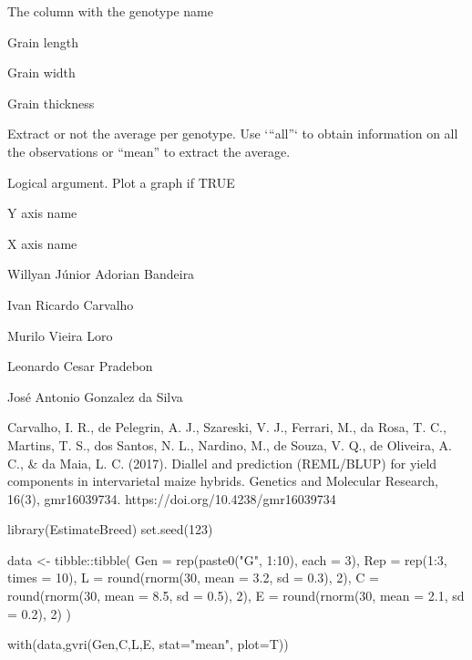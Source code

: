 \documentclass[a4paper]{book}
\begin{document}
%
\begin{Arguments}
\begin{ldescription}
\item[\code{GEN}] The column with the genotype name

\item[\code{C}] Grain length

\item[\code{L}] Grain width

\item[\code{E}] Grain thickness

\item[\code{stat}] Extract or not the average per genotype. Use `“all”` to obtain
information on all the observations or “mean” to extract the average.

\item[\code{plot}] Logical argument. Plot a graph if TRUE

\item[\code{ylab}] Y axis name

\item[\code{xlab}] X axis name
\end{ldescription}
\end{Arguments}
%
\begin{Author}
Willyan Júnior Adorian Bandeira

Ivan Ricardo Carvalho

Murilo Vieira Loro

Leonardo Cesar Pradebon

José Antonio Gonzalez da Silva
\end{Author}
%
\begin{References}
Carvalho, I. R., de Pelegrin, A. J., Szareski, V. J., Ferrari, M., da Rosa, T.
C., Martins, T. S., dos Santos, N. L., Nardino, M., de Souza, V. Q., de
Oliveira, A. C., \& da Maia, L. C. (2017). Diallel and prediction (REML/BLUP)
for yield components in intervarietal maize hybrids. Genetics and Molecular
Research, 16(3), gmr16039734.
https://doi.org/10.4238/gmr16039734
\end{References}
%
\begin{Examples}
\begin{ExampleCode}

library(EstimateBreed)
set.seed(123)

data <- tibble::tibble(
Gen = rep(paste0("G", 1:10), each = 3),
Rep = rep(1:3, times = 10),
L = round(rnorm(30, mean = 3.2, sd = 0.3), 2),
C = round(rnorm(30, mean = 8.5, sd = 0.5), 2),
E = round(rnorm(30, mean = 2.1, sd = 0.2), 2)
)

with(data,gvri(Gen,C,L,E, stat="mean", plot=T))

\end{ExampleCode}
\end{Examples}
\end{document}
